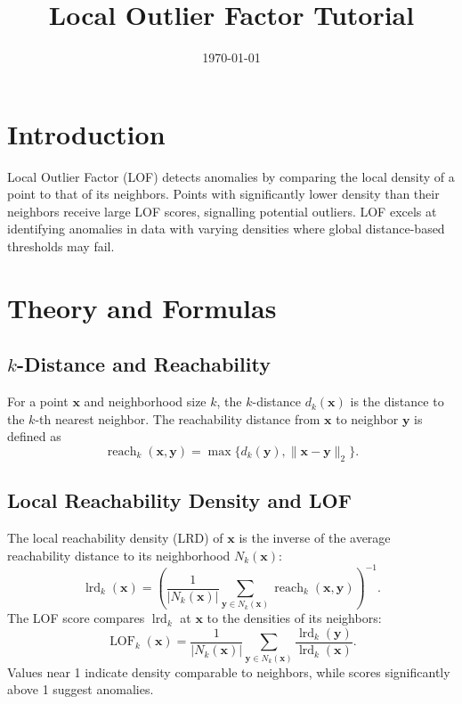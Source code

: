 ﻿\documentclass[12pt]{article}
\title{Local Outlier Factor Tutorial}
\author{}
\date{\today}
\begin{document}
\maketitle

\section{Introduction}
Local Outlier Factor (LOF) detects anomalies by comparing the local density of a point to that of its neighbors. Points with significantly lower density than their neighbors receive large LOF scores, signalling potential outliers. LOF excels at identifying anomalies in data with varying densities where global distance-based thresholds may fail.

\section{Theory and Formulas}
\subsection{$k$-Distance and Reachability}
For a point \(\mathbf{x}\) and neighborhood size \(k\), the \(k\)-distance \(d_k(\mathbf{x})\) is the distance to the \(k\)-th nearest neighbor. The reachability distance from \(\mathbf{x}\) to neighbor \(\mathbf{y}\) is defined as
\begin{equation}
\operatorname{reach}_k(\mathbf{x}, \mathbf{y}) = \max\{ d_k(\mathbf{y}), \lVert \mathbf{x} - \mathbf{y} \rVert_2 \}.
\end{equation}

\subsection{Local Reachability Density and LOF}
The local reachability density (LRD) of \(\mathbf{x}\) is the inverse of the average reachability distance to its neighborhood \(N_k(\mathbf{x})\):
\begin{equation}
\operatorname{lrd}_k(\mathbf{x}) = \left( \frac{1}{|N_k(\mathbf{x})|} \sum_{\mathbf{y} \in N_k(\mathbf{x})} \operatorname{reach}_k(\mathbf{x}, \mathbf{y}) \right)^{-1}.
\end{equation}
The LOF score compares \(\operatorname{lrd}_k\) at \(\mathbf{x}\) to the densities of its neighbors:
\begin{equation}
\operatorname{LOF}_k(\mathbf{x}) = \frac{1}{|N_k(\mathbf{x})|} \sum_{\mathbf{y} \in N_k(\mathbf{x})} \frac{\operatorname{lrd}_k(\mathbf{y})}{\operatorname{lrd}_k(\mathbf{x})}.
\end{equation}
Values near 1 indicate density comparable to neighbors, while scores significantly above 1 suggest anomalies.
\end{document}
